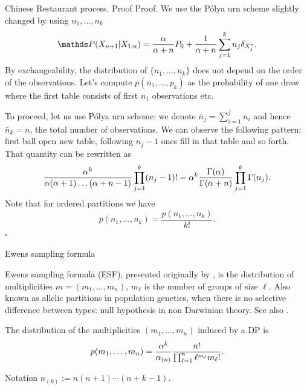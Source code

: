 \begin{frame}{Chinese Restaurant process. Proof}
\alert{Proof.}
	We use the P\'olya urn scheme slightly changed by using $n_1,\ldots, n_k$
\begin{equation*}
    \P(X_{n+1}|X_{1:n})=\frac{\PrecisionParam}{\PrecisionParam + n}P_0 + \frac{1}{\PrecisionParam + n}\sum_{j=1}^kn_j\delta_{X^*_j}.
\end{equation*}
    By exchangeability, the distribution of $\{n_1,\ldots, n_k\}$ does not depend on the order of the observations. Let's compute $p(n_1,\ldots, p_k)$ as the probability of one draw where the first table consists of first $n_1$ observations etc. 
    
    To proceed, let us use P\'olya urn scheme: we denote $\bar{n}_j=\sum_{i=1}^jn_i$ and hence $\bar{n}_k=n$, the total number of observations. We can observe the following pattern: first ball open new table, following $n_j-1$ ones fill in that table and so forth. That quantity can be rewritten as 
    $$
    \frac{\alpha^k}{\alpha(\alpha+1)\ldots(\alpha+n-1)}\prod_{j=1}^k(n_j-1)!=\alpha^k\frac{\Gamma(\alpha)}{\Gamma(\alpha+n)}\prod_{j=1}^k\Gamma (n_j).
    $$
Note that for ordered partitions we have 
$$
\bar{p}(n_1,\ldots,n_k)=\frac{p(n_1,\ldots,n_k)}{k!}.
$$
\hfill $\square$
\end{frame}


\begin{frame}{Ewens sampling formula}

Ewens sampling formula (ESF), presented originally by \citet{ewens1972sampling}, is the distribution of multiplicities $m=(m_1,\ldots, m_n)$, $m_\ell$ is the number of groups of size $\ell$.
Also known as allelic partitions in population genetics, when there is no selective difference between types: null hypothesis in non Darwinian theory.
See also \citet{antoniak1974mixtures}.

\begin{proposition}\label{ESF}
The distribution of the multiplicities $(m_1,\ldots, m_n)$ induced by a DP is
\begin{equation*}
    p(m_1,\ldots, m_n)=\frac{\alpha^k}{\alpha_{(n)}}\frac{n!}{\prod_{\ell=1}^n \ell^{m_\ell}m_\ell!}.
\end{equation*}
\end{proposition}\bigskip

Notation $n_{(k)}:=n(n+1)\cdots(n+k-1)$.



\end{frame}


